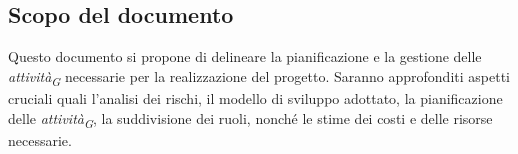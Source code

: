 \subsection{Scopo del documento}
Questo documento si propone di delineare la pianificazione e la gestione delle \textit{attività}\textsubscript{\textit{G}} necessarie per la realizzazione del progetto. Saranno approfonditi aspetti cruciali quali l'analisi dei rischi, il modello di sviluppo adottato, la pianificazione delle \textit{attività}\textsubscript{\textit{G}}, la suddivisione dei ruoli, nonché le stime dei costi e delle risorse necessarie.
